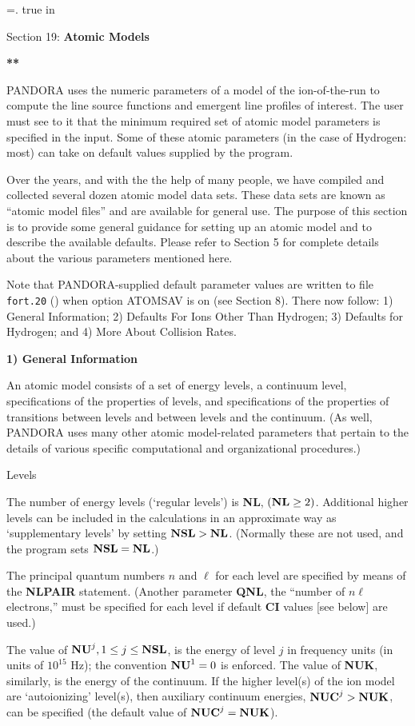 
\newtoks\footline \footline={\hss{}.\folio\hss}
%
%
\top
{} true in
\centerline{Section 19: {\bf Atomic Models}}
\blankline
\blankline
\centerline{\bf ***}
\blankline
\blankline
PANDORA uses the numeric parameters of a model of the ion-of-the-run
to compute the line source functions and emergent line profiles of interest.
The user must see to it that the minimum required set of atomic model
parameters is specified in the input. Some of these atomic parameters
(in the case of Hydrogen: most) can take on default values supplied
by the program.

Over the years, and with the the help of many people, we have compiled and
collected several dozen atomic model data sets. These data sets are known
as ``atomic model files'' and are available for general use.
\blankline
The purpose of this section is to provide some general guidance for setting
up an atomic model and to describe the available defaults. Please refer to
Section 5 for complete details about the various parameters mentioned here.

Note that PANDORA-supplied default parameter values are written to file
{\tt fort.20} () when option ATOMSAV is on (see Section 8).
\blankline
There now follow: 1) General Information; 2) Defaults For Ions Other Than
Hydrogen; 3) Defaults for Hydrogen; and 4) More About Collision Rates.
\ej
\centerline{\bf 1) General Information}
\blankline
An atomic model consists of a set of energy levels, a continuum level,
specifications of the properties of levels, and specifications of the
properties of transitions between levels and between levels and the continuum.
(As well, PANDORA uses many other atomic model-related parameters that
pertain to the details of various specific computational and organizational
procedures.)
\blankline
\centerline{Levels}
\blankline
The number of energy levels (`regular levels') is {\bf NL}, $({\bf NL} 
\geq 2)$. Additional higher levels can be included in the calculations in
an approximate way as `supplementary levels' by setting
${\bf NSL} > {\bf NL}$. (Normally these are not used, and the program
sets ${\bf NSL} = {\bf NL}$.)

The principal quantum numbers $n$ and $\ell$ for each level are specified by
means of the {\bf NLPAIR} statement. (Another parameter {\bf QNL}, the
``number of $n\ell$ electrons,'' must be specified for each level if default
{\bf CI} values [see below] are used.)

The value of ${\bf NU}^j, 1 \leq j \leq {\bf NSL}$, is the energy of
level $j$ in frequency units (in units of $10^{15}$ Hz);
the convention ${\bf NU}^1 = 0$ is enforced.
The value of {\bf NUK}, similarly, is the energy of the continuum.
If the higher level(s) of the ion model are `autoionizing' level(s),
then auxiliary continuum energies, ${\bf NUC}^j > {\bf NUK}$, can be
specified (the default value of ${\bf NUC}^j = {\bf NUK}$).

